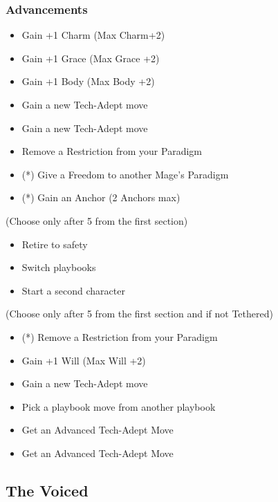 \documentclass[
]{article}
\providecommand{\tightlist}{%
  \setlength{\itemsep}{0pt}\setlength{\parskip}{0pt}}
\begin{document}
\hypertarget{advancements-6}{%
\subsubsection{Advancements}\label{advancements-6}}

\begin{itemize}
\tightlist
\item
  Gain +1 Charm (Max Charm+2)
\item
  Gain +1 Grace (Max Grace +2)
\item
  Gain +1 Body (Max Body +2)
\item
  Gain a new Tech-Adept move
\item
  Gain a new Tech-Adept move
\item
  Remove a Restriction from your Paradigm
\item
  (*) Give a Freedom to another Mage's Paradigm
\item
  (*) Gain an Anchor (2 Anchors max)
\end{itemize}

(Choose only after 5 from the first section)

\begin{itemize}
\tightlist
\item
  Retire to safety
\item
  Switch playbooks
\item
  Start a second character
\end{itemize}

(Choose only after 5 from the first section and if not Tethered)

\begin{itemize}
\tightlist
\item
  (*) Remove a Restriction from your Paradigm
\item
  Gain +1 Will (Max Will +2)
\item
  Gain a new Tech-Adept move
\item
  Pick a playbook move from another playbook
\item
  Get an Advanced Tech-Adept Move
\item
  Get an Advanced Tech-Adept Move
\end{itemize}

\newpage

\hypertarget{the-voiced}{%
\subsection{The Voiced}\label{the-voiced}}
\end{document}

